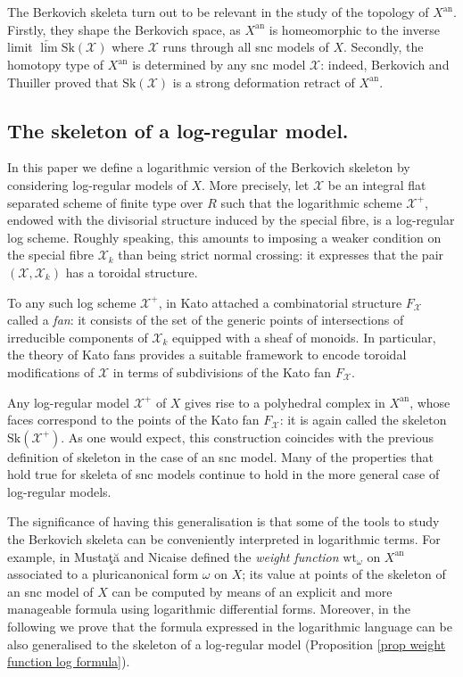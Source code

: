 \documentclass{amsart}%
\numberwithin{equation}{subsection}
\theoremstyle{plain2}
\theoremstyle{definition2}
\theoremstyle{stepstyle}
\theoremstyle{point}
\theoremstyle{subpoint}
\newcommand{\cX}{\ensuremath{\mathscr{X}}}
\newcommand{\an}{\mathrm{an}}
\newcommand{\weight}{\mathrm{wt}}
\newcommand{\Sk}{\mathrm{Sk}}
\begin{document}
The Berkovich skeleta turn out to be relevant in the study of the topology of $X^\an$. Firstly, they shape the Berkovich space, as $X^\an$ is homeomorphic to the inverse limit $\underleftarrow{\lim}\Sk(\cX)$ where $\cX$ runs through all snc models of $X$. Secondly, the homotopy type of $X^\an$ is determined by any snc model $\cX$: indeed, Berkovich and Thuiller proved that $\Sk(\cX)$ is a strong deformation retract of $X^\an$.

\subsection{The skeleton of a log-regular model.} In this paper we define a logarithmic version of the Berkovich skeleton by considering log-regular models of $X$. More precisely, let $\cX$ be an integral flat separated scheme of finite type over $R$ such that the logarithmic scheme $\cX^+$, endowed with the divisorial structure induced by the special fibre, is a log-regular log scheme. Roughly speaking, this amounts to imposing a weaker condition on the special fibre $\cX_k$ than being strict normal crossing: it expresses that the pair $(\cX,\cX_k)$ has a toroidal structure.

To any such log scheme $\cX^+$, in \cite{Kato1994a} Kato attached a combinatorial structure $F_\cX$ called a \emph{fan}: it consists of the set of the generic points of intersections of irreducible components of $\cX_k$ equipped with a sheaf of monoids. In particular, the theory of Kato fans provides a suitable framework to encode toroidal modifications of $\cX$ in terms of subdivisions of the Kato fan $F_\cX$.

Any log-regular model $\cX^+$ of $X$ gives rise to a polyhedral complex in $X^\an$, whose faces correspond to the points of the Kato fan $F_\cX$: it is again called the skeleton $\Sk(\cX^+)$. As one would expect, this construction coincides with the previous definition of skeleton in the case of an snc model. Many of the properties that hold true for skeleta of snc models continue to hold in the more general case of log-regular models.

The significance of having this generalisation is that some of the tools to study the Berkovich skeleta can be conveniently interpreted in logarithmic terms. For example, in \cite{MustataNicaise} Musta\c{t}\u{a} and Nicaise defined the \textit{weight function} $\weight_{\omega}$ on $X^\an$ associated to a pluricanonical form $\omega$ on $X$; its value at points of the skeleton of an snc model of $X$ can be computed by means of an explicit and more manageable formula using logarithmic differential forms. Moreover, in the following we prove that the formula expressed in the logarithmic language can be also generalised to the skeleton of a log-regular model (Proposition \ref{prop weight function log formula}).
\end{document}

